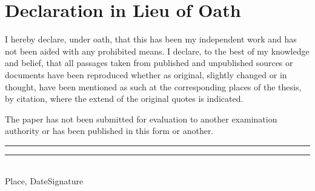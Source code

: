 \section*{\centering Declaration in Lieu of Oath}\thispagestyle{plain}\label{oath}
I hereby declare, under oath, that this \MakeLowercase{\thesis} has been my independent work and has not been aided with any prohibited means. I declare, to the best of my knowledge and belief, that all passages taken from published and unpublished sources or documents have been reproduced whether as original, slightly changed or in thought, have been mentioned as such at the corresponding places of the thesis, by citation, where the extend of the original quotes is indicated.

The paper has not been submitted for evaluation to another examination authority or has been published in this form or another.

\vspace{2.5cm}

\rule{5cm}{0.2pt}\hfill\rule{5cm}{0.2pt}\\
\footnotesize\phantom{}\hspace{17mm} Place, Date\hfill Signature\hspace{17mm}
\clearpage\normalsize